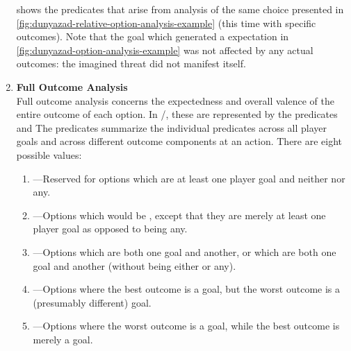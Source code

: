 \begin{enumerate}[leftmargin=1.4em]
 shows the  predicates that arise from analysis of the same choice presented in \cref{fig:dunyazad-relative-option-analysis-example} (this time with specific outcomes).
%
Note that the  goal which generated a  expectation in \cref{fig:dunyazad-option-analysis-example}{} was not affected by any actual outcomes: the imagined threat did not manifest itself.

\item %
\textbf{Full Outcome Analysis} \\
%
Full outcome analysis concerns the expectedness and overall valence of the entire outcome of each option.
In \dunyazad/, these are represented by the predicates   and 
%
The  predicates summarize the individual  predicates across all player goals and across different outcome components at an action.
%
There are eight possible  values:
%
\begin{enumerate}
  \item {}---Reserved for options which are  at least one player goal and neither  nor  any.
  \item {}---Options which would be , except that they are merely  at least one player goal as opposed to being  any.
  \item {}---Options which are both  one goal and  another, or which are both  one goal and  another (without being either  or  any).
  \item {}---Options where the best outcome is  a goal, but the worst outcome is  a (presumably different) goal.
\item {}---Options where the worst outcome is  a goal, while the best outcome is merely  a goal.

\end{enumerate}
\end{enumerate}
